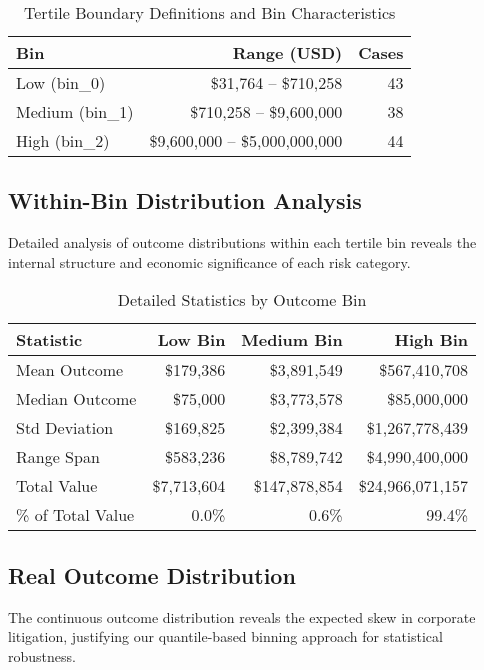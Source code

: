\documentclass[11pt]{article}
\begin{document}
\begin{table}[H]
\centering
\caption{Tertile Boundary Definitions and Bin Characteristics}
\begin{tabular}{lrr}
\toprule
\textbf{Bin} & \textbf{Range (USD)} & \textbf{Cases} \\
\midrule
Low (bin\_0) & \$31,764 -- \$710,258 & 43 \\
Medium (bin\_1) & \$710,258 -- \$9,600,000 & 38 \\
High (bin\_2) & \$9,600,000 -- \$5,000,000,000 & 44 \\
\bottomrule
\end{tabular}
\end{table}

\subsection{Within-Bin Distribution Analysis}

Detailed analysis of outcome distributions within each tertile bin reveals the internal structure and economic significance of each risk category.

\begin{table}[H]
\centering
\caption{Detailed Statistics by Outcome Bin}
\begin{tabular}{lrrr}
\toprule
\textbf{Statistic} & \textbf{Low Bin} & \textbf{Medium Bin} & \textbf{High Bin} \\
\midrule
Mean Outcome & \$179,386 & \$3,891,549 & \$567,410,708 \\
Median Outcome & \$75,000 & \$3,773,578 & \$85,000,000 \\
Std Deviation & \$169,825 & \$2,399,384 & \$1,267,778,439 \\
Range Span & \$583,236 & \$8,789,742 & \$4,990,400,000 \\
Total Value & \$7,713,604 & \$147,878,854 & \$24,966,071,157 \\
\% of Total Value & 0.0\% & 0.6\% & 99.4\% \\
\bottomrule
\end{tabular}
\end{table}

\subsection{Real Outcome Distribution}

The continuous outcome distribution reveals the expected skew in corporate litigation, justifying our quantile-based binning approach for statistical robustness.
\end{document}
